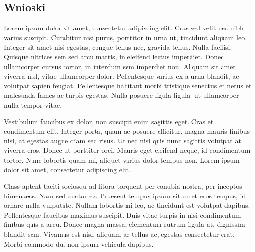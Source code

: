 \documentclass[a4paper,12pt]{article}
\begin{document}
\subsection*{Wnioski}
Lorem ipsum dolor sit amet, consectetur adipiscing elit. Cras sed velit nec nibh varius suscipit. Curabitur nisi purus, porttitor in urna ut, tincidunt aliquam leo. Integer sit amet nisi egestas, congue tellus nec, gravida tellus. Nulla facilisi. Quisque ultrices sem sed arcu mattis, in eleifend lectus imperdiet. Donec ullamcorper cursus tortor, in interdum sem imperdiet non. Aliquam sit amet viverra nisl, vitae ullamcorper dolor. Pellentesque varius ex a urna blandit, ac volutpat sapien feugiat. Pellentesque habitant morbi tristique senectus et netus et malesuada fames ac turpis egestas. Nulla posuere ligula ligula, ut ullamcorper nulla tempor vitae.

Vestibulum faucibus ex dolor, non suscipit enim sagittis eget. Cras et condimentum elit. Integer porta, quam ac posuere efficitur, magna mauris finibus nisi, at egestas augue diam sed risus. Ut nec nisi quis nunc sagittis volutpat at viverra eros. Donec ut porttitor orci. Mauris eget eleifend neque, id condimentum tortor. Nunc lobortis quam mi, aliquet varius dolor tempus non. Lorem ipsum dolor sit amet, consectetur adipiscing elit.

Class aptent taciti sociosqu ad litora torquent per conubia nostra, per inceptos himenaeos. Nam sed auctor ex. Praesent tempus ipsum sit amet eros tempus, id ornare nulla vulputate. Nullam lobortis mi leo, ac tincidunt est volutpat dapibus. Pellentesque faucibus maximus suscipit. Duis vitae turpis in nisi condimentum finibus quis a arcu. Donec magna massa, elementum rutrum ligula at, dignissim blandit sem. Vivamus est nisl, aliquam ac tellus ac, egestas consectetur erat. Morbi commodo dui non ipsum vehicula dapibus.
\end{document}
